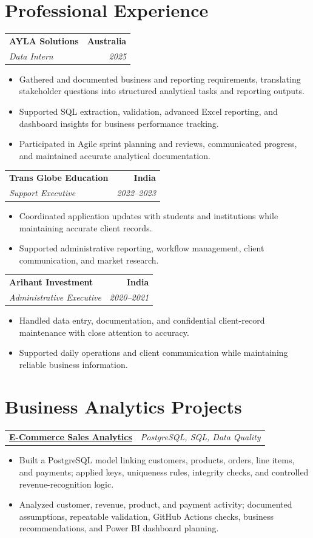 \documentclass[letterpaper,10pt]{article}
\makeatletter
\newcommand{\role}[4]{%
  \begin{tabularx}{\textwidth}{@{}Xr@{}}
    \textbf{#1} & \textbf{#2} \\
    \textit{#3} & \textit{#4}
  \end{tabularx}\vspace{-1pt}
}
\newcommand{\project}[2]{%
  \begin{tabularx}{\textwidth}{@{}Xr@{}}
    \textbf{#1} & \textit{#2}
  \end{tabularx}\vspace{-1pt}
}
\makeatother
\begin{document}
\section{Professional Experience}
\role{AYLA Solutions}{Australia}{Data Intern}{2025}
\begin{itemize}
  \item Gathered and documented business and reporting requirements, translating stakeholder questions into structured analytical tasks and reporting outputs.
  \item Supported SQL extraction, validation, advanced Excel reporting, and dashboard insights for business performance tracking.
  \item Participated in Agile sprint planning and reviews, communicated progress, and maintained accurate analytical documentation.
\end{itemize}
\vspace{1pt}

\role{Trans Globe Education}{India}{Support Executive}{2022--2023}
\begin{itemize}
  \item Coordinated application updates with students and institutions while maintaining accurate client records.
  \item Supported administrative reporting, workflow management, client communication, and market research.
\end{itemize}
\vspace{1pt}

\role{Arihant Investment}{India}{Administrative Executive}{2020--2021}
\begin{itemize}
  \item Handled data entry, documentation, and confidential client-record maintenance with close attention to accuracy.
  \item Supported daily operations and client communication while maintaining reliable business information.
\end{itemize}

\section{Business Analytics Projects}
\project{\href{https://github.com/jainalimehta/Ecommerce-Sales-Analytics}{E-Commerce Sales Analytics}}{PostgreSQL, SQL, Data Quality}
\begin{itemize}
  \item Built a PostgreSQL model linking customers, products, orders, line items, and payments; applied keys, uniqueness rules, integrity checks, and controlled revenue-recognition logic.
  \item Analyzed customer, revenue, product, and payment activity; documented assumptions, repeatable validation, GitHub Actions checks, business recommendations, and Power BI dashboard planning.
\end{itemize}
\vspace{1pt}
\end{document}
